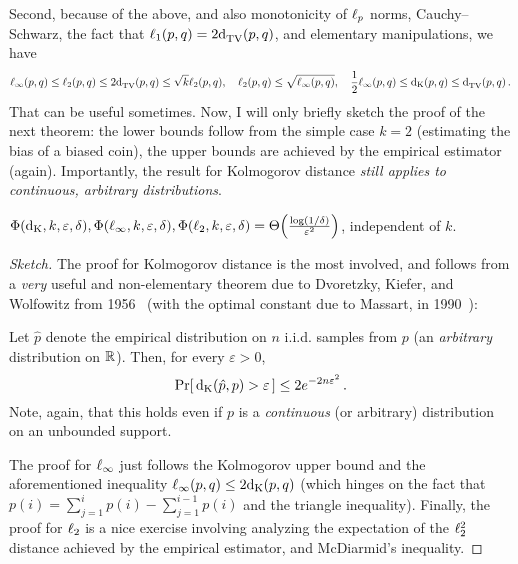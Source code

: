 \documentclass[10pt]{article}
\newcommand{\dst}{\varepsilon}
\newcommand{\ab}{k}
\newcommand{\ns}{n}
\begin{document}
Second, because of the above, and also monotonicity of $\lp[p]$ norms, Cauchy--Schwarz, the fact that $\lp[1](p,q) = 2\totalvardist{p}{q}$, and elementary manipulations, we have
\[
    \lp[\infty](p,q)\leq \lp[2](p,q)\leq 2\totalvardist{p}{q} \leq \sqrt{\ab}\lp[2](p,q), \quad 
    \lp[2](p,q)\leq \sqrt{\lp[\infty](p,q)}, \quad  \frac{1}{2}\lp[\infty](p,q)\leq \kolmogorov{p}{q} \leq \totalvardist{p}{q}\,.
\]
That can be useful sometimes. Now, I will only briefly sketch the proof of the next theorem: the lower bounds follow from the simple case $\ab=2$ (estimating the bias of a biased coin), the upper bounds are achieved by the empirical estimator (again). Importantly, the result for Kolmogorov distance \emph{still applies to continuous, arbitrary distributions}.
\begin{theorem}\label{theo:learning:tv}
  $\Phi(\operatorname{d_{\rm{}K}},\ab,\dst,\delta),\Phi(\lp[\infty],\ab,\dst,\delta),\Phi(\lp[2],\ab,\dst,\delta) = \bigTheta{\frac{\log(1/\delta)}{\dst^2}}$, independent of $\ab$.
\end{theorem}
\begin{proof}[Sketch]
The proof for Kolmogorov distance is the most involved, and follows from a \emph{very} useful and non-elementary theorem due to Dvoretzky, Kiefer, and Wolfowitz from 1956~\cite{DKW:56} (with the optimal constant due to Massart, in 1990~\cite{Massart:90}):
\begin{theorem}
  Let $\hat{p}$ denote the empirical distribution on $\ns$ i.i.d. samples from $p$ (an \emph{arbitrary} distribution on $\R$). Then, for every $\dst > 0$,
  \[
      \probaOf{ \kolmogorov{\hat{p}}{p} > \dst } \leq 2e^{-2\ns \dst^2 }\,.
  \]
  Note, again, that this holds even if $p$ is a \emph{continuous} (or arbitrary) distribution on an unbounded support.
\end{theorem}
The proof for $\lp[\infty]$ just follows the Kolmogorov upper bound and the aforementioned inequality $\lp[\infty](p,q) \leq 2\kolmogorov{p}{q}$ (which hinges on the fact that $p(i) = \sum_{j=1}^i p(i) - \sum_{j=1}^{i-1} p(i)$ and the triangle inequality). Finally, the proof for $\lp[2]$ is a nice exercise involving analyzing the expectation of the $\lp[2]^2$ distance achieved by the empirical estimator, and McDiarmid's inequality.
\end{proof}
\end{document}
